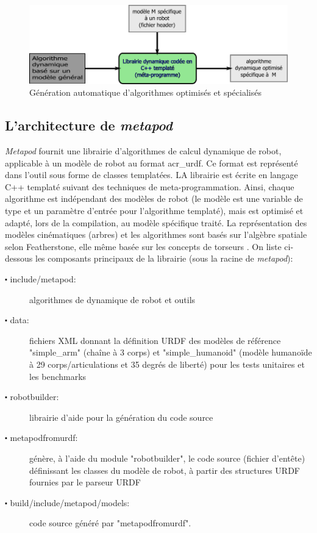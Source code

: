 \documentclass{report}
\begin{document}
\begin{figure}[H]
\centering
\includegraphics[width=\textwidth]{figs/principeAlgoGenerique.pdf}
\caption{Génération automatique d'algorithmes optimisés et spécialisés}
\end{figure}


\subsection{L'architecture de \emph{metapod}}

\emph{Metapod} fournit une librairie d'algorithmes de calcul dynamique de robot, applicable à un modèle de robot au format \gls{acr_urdf}. Ce format est représenté dans l'outil sous forme de classes templatées. LA librairie est écrite en langage C++ templaté suivant des techniques de meta-programmation. Ainsi, chaque algorithme est indépendant des modèles de robot (le modèle est une variable de type et un paramètre d'entrée pour l'algorithme templaté), mais est optimisé et adapté, lors de la compilation, au modèle spécifique traité. La représentation des modèles cinématiques (arbres) et les algorithmes sont basés sur l'algèbre spatiale selon Featherstone, elle même basée sur les concepts de torseurs \cite{bib_featherstone}. On liste ci-dessous les composants principaux de la librairie (sous la racine de \emph{metapod}):
\begin{description}
\item[$\centerdot$ include/metapod:] algorithmes de dynamique de robot et outils
\item[$\centerdot$ data:] fichiers XML donnant la définition URDF des modèles de référence "simple\_arm" (chaîne à 3 corps) et "simple\_humanoid" (modèle humanoïde à 29 corps/articulations et 35 degrés de liberté) pour les tests unitaires et les benchmarks
\item[$\centerdot$ robotbuilder:] librairie d'aide pour la génération du code source 
\item[$\centerdot$ metapodfromurdf:] génère, à l'aide du module "robotbuilder", le code source (fichier d'entête) définissant les classes du modèle de robot, à partir des structures URDF fournies par le parseur URDF
\item[$\centerdot$ build/include/metapod/models:] code source généré par "metapodfromurdf".
\end{description}
\end{document}
